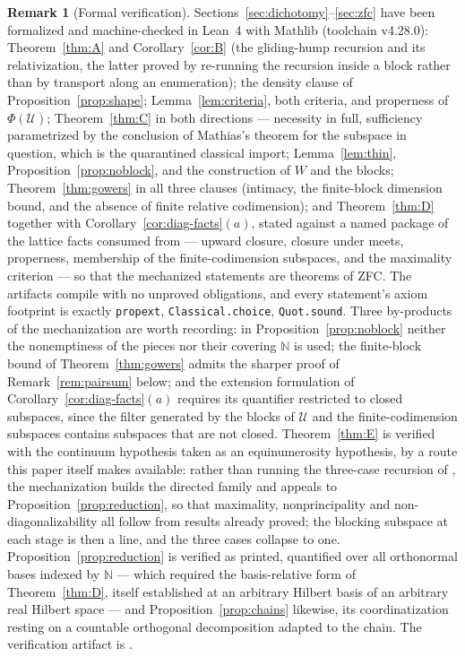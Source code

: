 \documentclass[11pt,reqno]{amsart}
\theoremstyle{definition}
\newtheorem{remark}[theorem]{Remark}
\newcommand{\N}{\mathbb{N}}
\newcommand{\U}{\mathcal{U}}
\begin{document}
\begin{remark}[Formal verification]\label{rem:lean2}
Sections~\ref{sec:dichotomy}--\ref{sec:zfc} have been formalized and
machine-checked in Lean~4 with Mathlib (toolchain v4.28.0):
Theorem~\ref{thm:A} and
Corollary~\ref{cor:B} (the gliding-hump recursion and its relativization,
the latter proved by re-running the recursion inside a block rather than by
transport along an enumeration); the density clause of
Proposition~\ref{prop:shape}; Lemma~\ref{lem:criteria}, both criteria, and
properness of $\Phi(\U)$; Theorem~\ref{thm:C} in both directions --- necessity
in full, sufficiency parametrized by the conclusion of Mathias's theorem for
the subspace in question, which is the quarantined classical import;
Lemma~\ref{lem:thin}, Proposition~\ref{prop:noblock}, and the construction of
$W$ and the blocks; Theorem~\ref{thm:gowers} in all three clauses (intimacy,
the finite-block dimension bound, and the absence of finite relative
codimension); and Theorem~\ref{thm:D} together with
Corollary~\ref{cor:diag-facts}$(a)$, stated against a named package of the
lattice facts consumed from \cite{FWI} --- upward closure, closure under
meets, properness, membership of the finite-codimension subspaces, and the
maximality criterion --- so that the mechanized statements are theorems of
ZFC. The artifacts compile with no unproved obligations, and every
statement's axiom footprint is exactly \texttt{propext},
\texttt{Classical.choice}, \texttt{Quot.sound}. Three by-products of the
mechanization are worth recording: in Proposition~\ref{prop:noblock} neither
the nonemptiness of the pieces nor their covering $\N$ is used; the
finite-block bound of Theorem~\ref{thm:gowers} admits the sharper proof of
Remark~\ref{rem:pairsum} below; and the extension formulation of
Corollary~\ref{cor:diag-facts}$(a)$ requires its quantifier restricted to
closed subspaces, since the filter generated by the blocks of $\U$ and the
finite-codimension subspaces contains subspaces that are not closed. Theorem~\ref{thm:E} is verified with the continuum hypothesis taken as an
equinumerosity hypothesis, by a route this paper itself makes available:
rather than running the three-case recursion of \cite{FWI}, the mechanization
builds the directed family and appeals to
Proposition~\ref{prop:reduction}, so that maximality, nonprincipality and
non-diagonalizability all follow from results already proved; the blocking
subspace at each stage is then a line, and the three cases collapse to one.
Proposition~\ref{prop:reduction} is verified as printed, quantified over all
orthonormal bases indexed by $\N$ --- which required the basis-relative form
of Theorem~\ref{thm:D}, itself established at an arbitrary Hilbert basis of an
arbitrary real Hilbert space --- and Proposition~\ref{prop:chains} likewise,
its coordinatization resting on a countable orthogonal decomposition adapted to
the chain. The verification artifact is \cite{plufLean}.
\end{remark}
\end{document}
